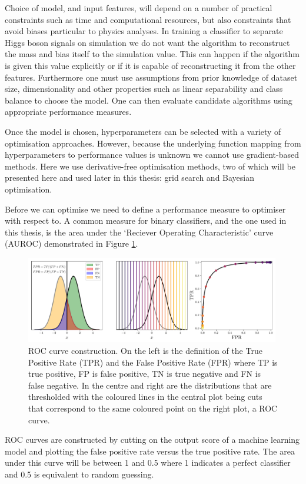 Choice of model, and input features, will depend on a number of practical constraints such as time and computational resources, but also constraints that avoid biases particular to physics analyses. 
In training a classifier to separate Higgs boson signals on simulation we do not want the algorithm to reconstruct the mass and bias itself to the simulation value. This can happen if the algorithm is given this value explicitly or if it is capable of reconstructing it from the other features.  
Furthermore one must use assumptions from prior knowledge of dataset size, dimensionality and other properties such as linear separability and class balance to choose the model. One can then evaluate candidate algorithms using appropriate performance measures. 


Once the model is chosen, hyperparameters can be selected with a variety of optimisation approaches. However, because the underlying function mapping from hyperparameters to performance values is unknown we cannot use gradient-based methods. Here we use derivative-free optimisation methods, two of which will be presented here and used later in this thesis: grid search and Bayesian optimisation. 

Before we can optimise we need to define a performance measure to optimiser with respect to. A common measure for binary classifiers, and the one used in this thesis, is the area under the `Reciever Operating Characteristic' curve (AUROC) demonstrated in Figure \ref{fig:machine_learning:ROC_curve}. 
\begin{figure}[h!]
    \begin{center}
        \includegraphics[width=0.99\textwidth]{figures/machine_learning/ROC_figure.pdf}
    \end{center}
    \caption{ROC curve construction. On the left is the definition of the True Positive Rate (TPR) and the False Positive Rate (FPR) where TP is true positive, FP is false positive, TN is true negative and FN is false negative. In the centre and right are the distributions that are thresholded with the coloured lines in the central plot being cuts that correspond to the same coloured point on the right plot, a ROC curve. }
        \label{fig:machine_learning:ROC_curve}
\end{figure}
ROC curves are constructed by cutting on the output score of a machine learning model and plotting the false positive rate versus the true positive rate. The area under this curve will be between 1 and 0.5 where 1 indicates a perfect classifier and 0.5 is equivalent to random guessing. 


